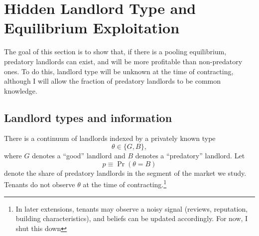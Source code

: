 \documentclass[11pt]{article}
\begin{document}





\section{Hidden Landlord Type and Equilibrium Exploitation}
\label{sec:hidden-type}

The goal of this section is to show that, if there is a pooling equilibrium, predatory landlords can exist, and will be more profitable than non-predatory ones. To do this, landlord type will be unknown at the time of contracting, although I will allow the fraction of predatory landlords to be common knowledge.

\subsection{Landlord types and information}

There is a continuum of landlords indexed by a privately known type
\[
\theta \in \{G,B\},
\]
where $G$ denotes a ``good'' landlord and $B$ denotes a ``predatory'' landlord. Let
\[
p \equiv \Pr(\theta=B)
\]
denote the share of predatory landlords in the segment of the market we study. Tenants do not observe $\theta$ at the time of contracting.\footnote{In later extensions, tenants may observe a noisy signal (reviews, reputation, building characteristics), and beliefs can be updated accordingly. For now, I shut this down}\\
\end{document}
